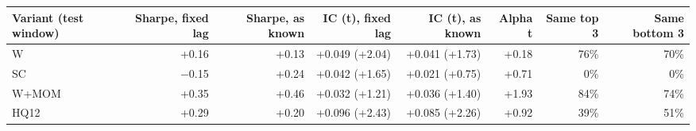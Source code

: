 \begin{tabular}{lrrrrrrr}
\toprule
Variant (test window) & Sharpe, fixed lag & Sharpe, as known & IC (t), fixed lag & IC (t), as known & Alpha t & Same top 3 & Same bottom 3 \\
\midrule
W & +0.16 & +0.13 & +0.049 (+2.04) & +0.041 (+1.73) & +0.18 & 76\% & 70\% \\
SC & $-$0.15 & +0.24 & +0.042 (+1.65) & +0.021 (+0.75) & +0.71 & 0\% & 0\% \\
W+MOM & +0.35 & +0.46 & +0.032 (+1.21) & +0.036 (+1.40) & +1.93 & 84\% & 74\% \\
HQ12 & +0.29 & +0.20 & +0.096 (+2.43) & +0.085 (+2.26) & +0.92 & 39\% & 51\% \\
\bottomrule
\end{tabular}

